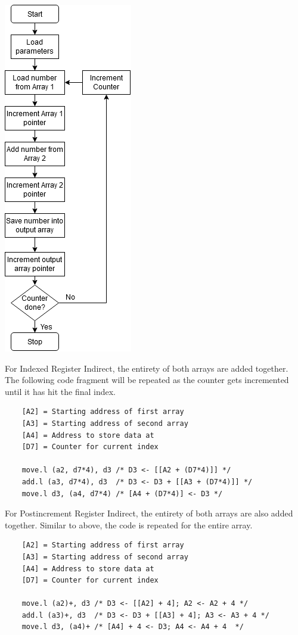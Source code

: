 \documentclass[12pt]{article}
\begin{document}
\begin{center}
    \includegraphics[scale = 0.5]{Lab2/flowchart3.png}
    \end{center}
    
    For Indexed Register Indirect, the entirety of both arrays are added together. The following code fragment will be repeated as the counter gets incremented until it has hit the final index.
    
    \begin{verbatim}
    [A2] = Starting address of first array
    [A3] = Starting address of second array
    [A4] = Address to store data at
    [D7] = Counter for current index
    
    move.l (a2, d7*4), d3 /* D3 <- [[A2 + (D7*4)]] */
    add.l (a3, d7*4), d3  /* D3 <- D3 + [[A3 + (D7*4)]] */
    move.l d3, (a4, d7*4) /* [A4 + (D7*4)] <- D3 */
    \end{verbatim}
    
    For Postincrement Register Indirect, the entirety of both arrays are also added together. Similar to above, the code is repeated for the entire array.
    
    \begin{verbatim}
    [A2] = Starting address of first array
    [A3] = Starting address of second array
    [A4] = Address to store data at
    [D7] = Counter for current index
    
    move.l (a2)+, d3 /* D3 <- [[A2] + 4]; A2 <- A2 + 4 */
    add.l (a3)+, d3  /* D3 <- D3 + [[A3] + 4]; A3 <- A3 + 4 */
    move.l d3, (a4)+ /* [A4] + 4 <- D3; A4 <- A4 + 4  */
    \end{verbatim}
\end{document}
